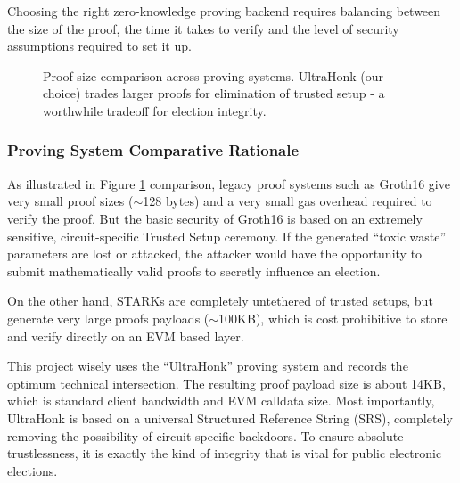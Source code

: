 \documentclass[12pt, a4paper]{report}
\begin{document}
Choosing the right zero-knowledge proving backend requires balancing between the size of the proof, the time it takes to verify and the level of security assumptions required to set it up.

\begin{figure}[H]
\centering
{}
\caption{Proof size comparison across proving systems. UltraHonk (our choice) trades larger proofs for elimination of trusted setup - a worthwhile tradeoff for election integrity.}
\label{fig:proof_size}
\end{figure}

\subsubsection*{Proving System Comparative Rationale}
As illustrated in Figure \ref{fig:proof_size} comparison, legacy proof systems such as Groth16 give very small proof sizes ($\sim$128 bytes) and a very small gas overhead required to verify the proof. But the basic security of Groth16 is based on an extremely sensitive, circuit-specific Trusted Setup ceremony. If the generated ``toxic waste'' parameters are lost or attacked, the attacker would have the opportunity to submit mathematically valid proofs to secretly influence an election.

On the other hand, STARKs are completely untethered of trusted setups, but generate very large proofs payloads ($\sim$100KB), which is cost prohibitive to store and verify directly on an EVM based layer.

This project wisely uses the ``UltraHonk'' proving system and records the optimum technical intersection. The resulting proof payload size is about 14KB, which is standard client bandwidth and EVM calldata size. Most importantly, UltraHonk is based on a universal Structured Reference String (SRS), completely removing the possibility of circuit-specific backdoors. To ensure absolute trustlessness, it is exactly the kind of integrity that is vital for public electronic elections.
\end{document}
